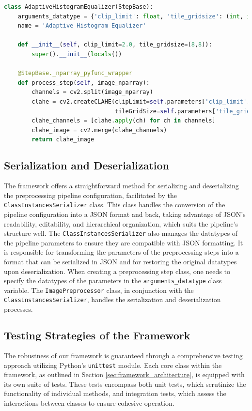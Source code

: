 \documentclass[journal ]{new-aiaa}
\begin{document}
\begin{lstlisting}[language=Python, caption=Example of a Preprocessing Step Implementation, label=lst:preprocessing_step]
class AdaptiveHistogramEqualizer(StepBase):
    arguments_datatype = {'clip_limit': float, 'tile_gridsize': (int, int)}
    name = 'Adaptive Histogram Equalizer'

    def __init__(self, clip_limit=2.0, tile_gridsize=(8,8)):
        super().__init__(locals())

    @StepBase._nparray_pyfunc_wrapper
    def process_step(self, image_nparray):
        channels = cv2.split(image_nparray)
        clahe = cv2.createCLAHE(clipLimit=self.parameters['clip_limit'],
                                tileGridSize=self.parameters['tile_gridsize'])
        clahe_channels = [clahe.apply(ch) for ch in channels]
        clahe_image = cv2.merge(clahe_channels)
        return clahe_image
\end{lstlisting}

\subsection{Serialization and Deserialization}
The framework offers a straightforward method for serializing and deserializing the preprocessing pipeline configuration, facilitated by the \texttt{ClassInstancesSerializer} class. This class handles the conversion of the pipeline configuration into a JSON format and back, taking advantage of JSON's readability, editability, and hierarchical organization, which suits the pipeline's structure well. The \texttt{ClassInstancesSerializer} also manages the datatypes of the pipeline parameters to ensure they are compatible with JSON formatting. It is responsible for transforming the parameters of the preprocessing steps into a format that can be serialized in JSON and for restoring the original datatypes upon deserialization. When creating a preprocessing step class, one needs to specify the datatypes of the parameters in the \texttt{arguments\_datatype} class variable. The \texttt{ImagePreprocessor} class, in conjunction with the \texttt{ClassInstancesSerializer}, handles the serialization and deserialization processes.


\subsection{Testing Strategies of the Framework}
The robustness of our framework is guaranteed through a comprehensive testing approach utilizing Python's \texttt{unittest} module. Each core class within the framework, as outlined in Section \ref{sec:framework_architecture}, is equipped with its own suite of tests. These tests encompass both unit tests, which scrutinize the functionality of individual methods, and integration tests, which assess the interactions between classes to ensure cohesive operation.
\end{document}
